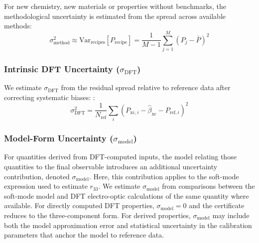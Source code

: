 \documentclass[prb,twocolumn,superscriptaddress,amsmath,amssymb,longbibliography]{revtex4-2}
\newcommand{\xc}{\mathrm{xc}}
\newcommand{\meth}{\mathrm{method}}
\begin{document}
For new chemistry, new materials or properties without benchmarks, the methodological 
uncertainty is estimated from the spread across available methods:
\begin{equation}
    \sigma_\meth^2 \approx \mathrm{Var}_{\mathrm{recipes}}[P_{\mathrm{recipe}}]
    = \frac{1}{M-1} \sum_{j=1}^{M} (P_j - \bar{P})^2
    \label{eq:method_spread}
\end{equation}

\subsubsection{Intrinsic DFT Uncertainty ($\sigma_{\mathrm{DFT}}$)}

We estimate $\sigma_{\mathrm{DFT}}$ from the residual spread relative to reference data after correcting systematic biases: 
\cite{Pernot2015,Pernot2020}:
\begin{equation}
    \sigma_{\mathrm{DFT}}^2 = \frac{1}{N_{\mathrm{ref}}} \sum_i 
    \left( P_{\xc,i} - \hat{\beta}_{\xc} - P_{\mathrm{ref},i} \right)^2
    \label{eq:intrinsic_dft}
\end{equation}

\subsubsection{Model-Form Uncertainty ($\sigma_{\mathrm{model}}$)}

For quantities derived from DFT-computed inputs, the model relating those quantities to the final observable introduces an additional uncertainty contribution, denoted  $\sigma_{\mathrm{model}}$. Here, this contribution applies to the soft-mode expression used to estimate $r_{33}$. We estimate $\sigma_{\mathrm{model}}$ from comparisons between the soft-mode model and 
DFT electro-optic calculations of the same quantity where available. 
For directly computed DFT properties, $\sigma_{\mathrm{model}} = 0$ and 
the certificate reduces to the three-component form. For derived 
properties, $\sigma_{\mathrm{model}}$ may include both the model 
approximation error and statistical uncertainty in the calibration 
parameters that anchor the model to reference data.
\end{document}
